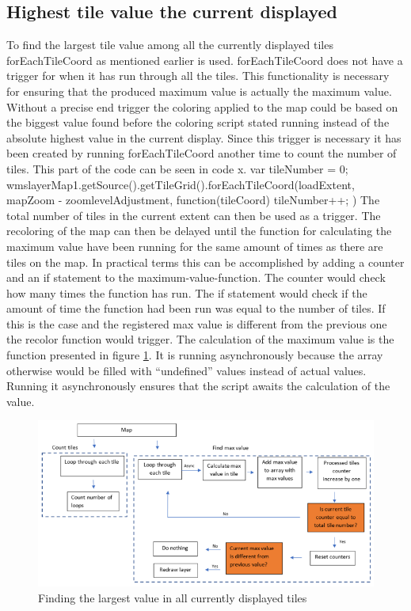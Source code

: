 \subsection{Highest tile value the current displayed}


To find the largest tile value among all the currently displayed tiles forEachTileCoord as mentioned earlier is used. forEachTileCoord does not have a trigger for when it has run through all the tiles. This functionality is necessary for ensuring that the produced maximum value is actually the maximum value. Without a precise end trigger the coloring applied to the map could be based on the biggest value found before the coloring script stated running instead of the absolute highest value in the current display.
Since this trigger is necessary it has been created by running forEachTileCoord another time to count the number of tiles. This part of the code can be seen in code x. 
  var tileNumber = 0;
  wmslayerMap1.getSource().getTileGrid().forEachTileCoord(loadExtent, mapZoom - zoomlevelAdjustment, function(tileCoord) {
    tileNumber++;
  })
The total number of tiles in the current extent can then be used as a trigger. 
The recoloring of the map can then be delayed until the function for calculating the maximum value have been running for the same amount of times as there are tiles on the map. In practical terms this can be accomplished by adding a counter and an if statement to the maximum-value-function. The counter would check how many times the function has run. The if statement would check if the amount of time the function had been run was equal to the number of tiles. If this is the case and the registered max value is different from the previous one the recolor function would trigger.
The calculation of the maximum value is the function presented in figure \ref{DoubleLoop}. It is running asynchronously because the array otherwise would be filled with “undefined” values instead of actual values. Running it asynchronously ensures that the script awaits the calculation of the value.  
 \begin{figure} [H]
 	\centering
 	\includegraphics[width=.8\textwidth]{Pictures/DoubleLoop}
 	\caption{Finding the largest value in all currently displayed tiles}
 	\label{DoubleLoop}
 \end{figure}


